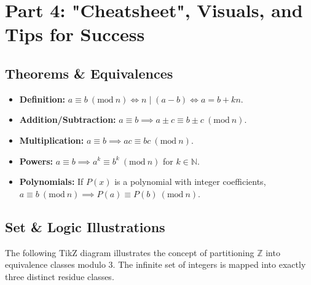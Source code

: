 \documentclass[11pt]{article}
\newcommand{\Z}{\mathbb{Z}}
\newcommand{\N}{\mathbb{N}}
\newcommand{\modulo}[1]{\ (\mathrm{mod}\ #1)}
\begin{document}
\newpage
\section{Part 4: "Cheatsheet", Visuals, and Tips for Success}

\subsection{Theorems \& Equivalences}
\begin{itemize}
    \item \textbf{Definition:} $a \equiv b \modulo{n} \iff n \mid (a-b) \iff a = b + kn$.
    \item \textbf{Addition/Subtraction:} $a \equiv b \implies a \pm c \equiv b \pm c \modulo{n}$.
    \item \textbf{Multiplication:} $a \equiv b \implies ac \equiv bc \modulo{n}$.
    \item \textbf{Powers:} $a \equiv b \implies a^k \equiv b^k \modulo{n}$ for $k \in \N$.
    \item \textbf{Polynomials:} If $P(x)$ is a polynomial with integer coefficients, $a \equiv b \modulo{n} \implies P(a) \equiv P(b) \modulo{n}$.
\end{itemize}

\subsection{Set \& Logic Illustrations}
The following TikZ diagram illustrates the concept of partitioning $\Z$ into equivalence classes modulo 3. The infinite set of integers is mapped into exactly three distinct residue classes.
\end{document}
